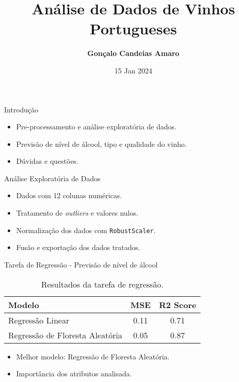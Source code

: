 \documentclass{beamer}
\title{\textbf{Análise de Dados de Vinhos Portugueses}}
\author{\textbf{Gonçalo Candeias Amaro}}
\date{15 Jan 2024}
\begin{document}
    \begin{frame}
        \titlepage
    \end{frame}

    \begin{frame}{Introdução}
        \begin{itemize}
            \item Pre-processamento e análise exploratória de dados.
            \item Previsão de nível de álcool, tipo e qualidade do vinho.
            \item Dúvidas e questões.
        \end{itemize}
    \end{frame}

    \begin{frame}{Análise Exploratória de Dados}
        \begin{itemize}
            \item Dados com 12 colunas numéricas.
            \item Tratamento de \textit{outliers} e valores nulos.
            \item Normalização dos dados com \texttt{RobustScaler}.
            \item Fusão e exportação dos dados tratados.
        \end{itemize}
    \end{frame}

    \begin{frame}{Tarefa de Regressão - Previsão de nível de álcool}
        \begin{table}
            \centering
            \begin{tabular}{@{}lcc@{}}
                \toprule
                Modelo                          & MSE  & R2 Score \\ \midrule
                Regressão Linear                & 0.11 & 0.71     \\
                Regressão de Floresta Aleatória & 0.05 & 0.87     \\ \bottomrule
            \end{tabular}
            \caption{Resultados da tarefa de regressão.}
            \label{tab:table3}
        \end{table}
        \begin{itemize}
            \item Melhor modelo: Regressão de Floresta Aleatória.
            \item Importância dos atributos analisada.
        \end{itemize}
    \end{frame}
\end{document}
